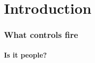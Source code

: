 \section{Introduction}
\begin{frame}
    \frametitle{What controls fire}
    \framesubtitle{Is it people?}
\end{frame}
